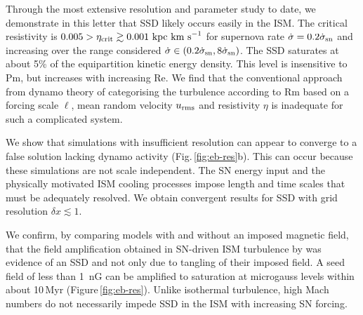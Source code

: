 \documentclass[preprint2]{aastex63}
\newcommand\SNr{\dot\sigma_{\rm sn}}
\newcommand\kpc{~ {\rm kpc}}
\newcommand\pc{~ {\rm pc}}
\newcommand\dx{ {\delta x}}
\newcommand\kms{~ {\rm km~ s}^{-1}}
\newcommand{\fg}[1]{\textcolor{midgreen}{#1}}
\newcommand{\mm}[1]{\textcolor{mypurple}{#1}}
\begin{document}
 \fg{Through the most extensive resolution and parameter study to date, we
   demonstrate in this letter that SSD
\mm{likely occurs easily}
 in the ISM.
 The critical resistivity is $0.005>\eta_{\rm crit}\gtrsim0.001\kpc\kms$ for 
 supernova rate $\dot \sigma=0.2\SNr$ and increasing over the 
 range considered $\dot \sigma\in(0.2\SNr,8\SNr)$.
 \mm{The} SSD
 saturates at about 5\% of the equiparti\mm{ti}on kinetic energy
 density.
 This level is insensitive to Pm, but \mm{increases} with increasing Re.}
 We find that the conventional approach from dynamo theory of categorising the 
 turbulence according to Rm based on a forcing scale $\ell$, mean random
 velocity $u_{\rm rms}$ and resistivity $\eta$ is inadequate for such a
 complicated system.

 We show that simulations with insufficient resolution can appear to
 converge to a false solution lacking dynamo activity
 (Fig.\,\ref{fig:eb-res}b). This can occur because these simulations are not
 scale independent. 
 The SN energy input and the physically motivated ISM cooling processes impose
 length and time scales that must be adequately resolved.
 \fg{We obtain convergent results for SSD with grid resolution
 $\dx\lesssim1$.}

\fg{We confirm,
  \mm{by comparing models with and without} an imposed magnetic field,
 that the field amplification obtained in SN-driven ISM turbulence by \citet{BKMM04}
 was evidence of an SSD and not only due to tangling of their imposed field.}
 A seed field of less than 1~nG can be amplified to saturation at microgauss
 levels within about 10\,Myr (Figure\,\ref{fig:eb-res}). 
 Unlike isothermal turbulence, high Mach numbers do not necessarily impede SSD
 in the ISM with increasing SN forcing.

\end{document}
